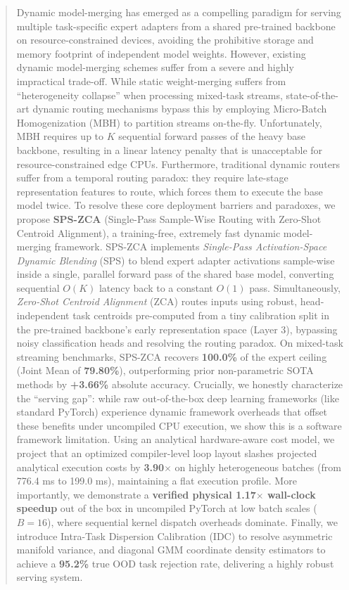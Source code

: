 \begin{abstract}
Dynamic model-merging has emerged as a compelling paradigm for serving multiple task-specific expert adapters from a shared pre-trained backbone on resource-constrained devices, avoiding the prohibitive storage and memory footprint of independent model weights. However, existing dynamic model-merging schemes suffer from a severe and highly impractical trade-off. While static weight-merging suffers from ``heterogeneity collapse'' when processing mixed-task streams, state-of-the-art dynamic routing mechanisms bypass this by employing Micro-Batch Homogenization (MBH) to partition streams on-the-fly. Unfortunately, MBH requires up to $K$ sequential forward passes of the heavy base backbone, resulting in a linear latency penalty that is unacceptable for resource-constrained edge CPUs. Furthermore, traditional dynamic routers suffer from a temporal routing paradox: they require late-stage representation features to route, which forces them to execute the base model twice. 
To resolve these core deployment barriers and paradoxes, we propose \textbf{SPS-ZCA} (Single-Pass Sample-Wise Routing with Zero-Shot Centroid Alignment), a training-free, extremely fast dynamic model-merging framework. SPS-ZCA implements \textit{Single-Pass Activation-Space Dynamic Blending} (SPS) to blend expert adapter activations sample-wise inside a single, parallel forward pass of the shared base model, converting sequential $O(K)$ latency back to a constant $O(1)$ pass. Simultaneously, \textit{Zero-Shot Centroid Alignment} (ZCA) routes inputs using robust, head-independent task centroids pre-computed from a tiny calibration split in the pre-trained backbone's early representation space (Layer 3), bypassing noisy classification heads and resolving the routing paradox.
On mixed-task streaming benchmarks, SPS-ZCA recovers \textbf{100.0\%} of the expert ceiling (Joint Mean of \textbf{79.80\%}), outperforming prior non-parametric SOTA methods by \textbf{+3.66\%} absolute accuracy. Crucially, we honestly characterize the ``serving gap'': while raw out-of-the-box deep learning frameworks (like standard PyTorch) experience dynamic framework overheads that offset these benefits under uncompiled CPU execution, we show this is a software framework limitation. Using an analytical hardware-aware cost model, we project that an optimized compiler-level loop layout slashes projected analytical execution costs by \textbf{3.90$\times$} on highly heterogeneous batches (from 776.4 ms to 199.0 ms), maintaining a flat execution profile. More importantly, we demonstrate a \textbf{verified physical 1.17$\times$ wall-clock speedup} out of the box in uncompiled PyTorch at low batch scales ($B=16$), where sequential kernel dispatch overheads dominate. Finally, we introduce Intra-Task Dispersion Calibration (IDC) to resolve asymmetric manifold variance, and diagonal GMM coordinate density estimators to achieve a \textbf{95.2\%} true OOD task rejection rate, delivering a highly robust serving system.
\end{abstract}
